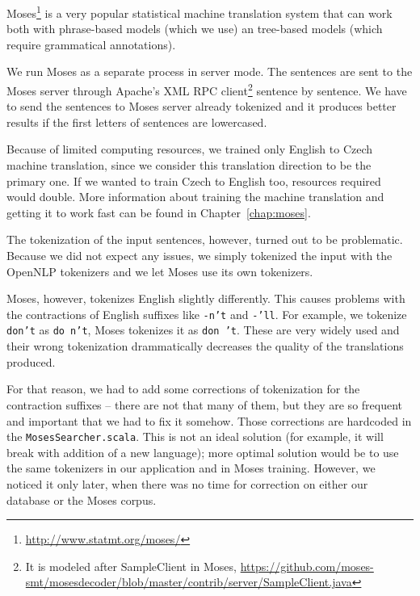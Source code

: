 Moses\footnote{\url{http://www.statmt.org/moses/}} is a very popular statistical machine translation system that can work both with phrase-based models (which we use) an tree-based models (which require grammatical annotations).

We run Moses as a separate process in server mode. The sentences are sent to the Moses server through Apache's XML RPC client\footnote{It is modeled after SampleClient in Moses, \url{https://github.com/moses-smt/mosesdecoder/blob/master/contrib/server/SampleClient.java}} sentence by sentence. We have to send the sentences to Moses server already tokenized and it produces better results if the first letters of sentences are lowercased.

Because of limited computing resources, we trained only English to Czech machine translation, since we consider this translation direction to be the primary one. If we wanted to train Czech to English too, resources required would double. More information about training the machine translation and getting it to work fast can be found in Chapter~\ref{chap:moses}.

The tokenization of the input sentences, however, turned out to be problematic. Because we did not expect any issues,
we simply tokenized the input with the OpenNLP tokenizers and we let Moses use its own tokenizers.

Moses, however, tokenizes English slightly differently. This causes problems with the contractions of English suffixes like \texttt{-n't} and \texttt{-'ll}. For example, we tokenize \texttt{don't} as \texttt{do n't}, Moses tokenizes it as \texttt{don 't}. These are very widely used and their wrong tokenization
drammatically decreases the quality of the translations produced.

For that reason, we had to add some corrections of tokenization for the contraction suffixes -- there are not that many of them, but they are so frequent and important that we had to fix it somehow. Those corrections are hardcoded in the \texttt{MosesSearcher.scala}. This is not an ideal solution (for example, it will break with addition of a new language); more optimal solution would be to use the same tokenizers in our application and in Moses training. However, we noticed it only later, when there was no time for correction on either our database or the Moses corpus.

